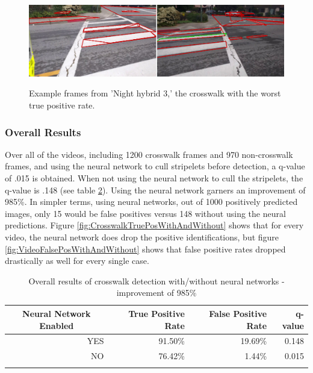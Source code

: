 \documentclass[12pt]{ucthesis}
\newcommand{\captionfonts}{\small\bf\ssp}
\begin{document}
\begin{figure}[H]
\begin{center}
\includegraphics[width=14cm]{WorstCwalk.png}
\captionfonts
\caption[Examples of worst crosswalk]{Example frames from 'Night hybrid 3,' the crosswalk with the worst true positive rate.}
\label{fig:worstcwalk}
\end{center}
\end{figure}

\subsubsection{Overall Results}
Over all of the videos, including 1200 crosswalk frames and 970 non-crosswalk frames, and using the neural network to cull stripelets before detection, a q-value of .015 is obtained. When not using the neural network to cull the stripelets, the q-value is .148 (see table \ref{tab:overallresults}). Using the neural network garners an improvement of 985\%. In simpler terms, using neural networks, out of 1000 positively predicted images, only 15 would be false positives versus 148 without using the neural predictions. Figure \ref{fig:CrosswalkTruePosWithAndWithout} shows that for every video, the neural network does drop the positive identifications, but figure \ref{fig:VideoFalsePosWithAndWithout} shows that false positive rates dropped drastically as well for every single case. 


\begin{table}[t]
    \begin{longtable}[H]{|r|r|r|r|}
    \hline
    \multicolumn{1}{|c|}{Neural Network Enabled} & True Positive Rate & False Positive Rate & q-value \bigstrut\\
    \hline
    YES & 91.50\% & 19.69\% & 0.148 \bigstrut\\
    \hline
    NO & 76.42\% & 1.44\% & 0.015 \bigstrut\\
    \hline

    \caption[Overall Results of Crosswalk Detection With and Without Neural Networks]{Overall results of crosswalk detection with/without neural networks -  improvement of 985\%}
    \label{tab:overallresults} 
    \end{longtable}
\end{table}
\end{document}
